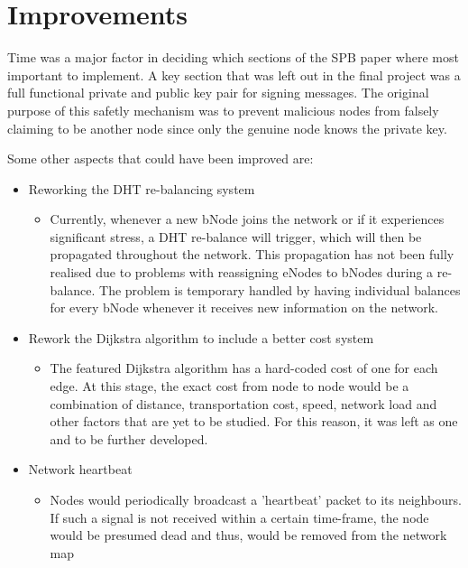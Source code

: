 \chapter{Improvements}\label{ch:improvements}

Time was a major factor in deciding which sections of the SPB paper where most important to implement. A key section that was left out in the final project was a full functional private and public key pair for signing messages. The original purpose of this safetly mechanism was to prevent malicious nodes from falsely claiming to be another node since only the genuine node knows the private key.

Some other aspects that could have been improved are:

\begin{itemize}
  \item Reworking the DHT re-balancing system
  \begin{itemize}
      \item Currently, whenever a new bNode joins the network or if it experiences significant stress, a DHT re-balance will trigger, which will then be propagated throughout the network. This propagation has not been fully realised due to problems with reassigning eNodes to bNodes during a re-balance. The problem is temporary handled by having individual balances for every bNode whenever it receives new information on the network.
  \end{itemize}
  \item Rework the Dijkstra algorithm to include a better cost system
    \begin{itemize}
      \item The featured Dijkstra algorithm has a hard-coded cost of one for each edge. At this stage, the exact cost from node to node would be a combination of distance, transportation cost, speed, network load and other factors that are yet to be studied. For this reason, it was left as one and to be further developed.
    \end{itemize}
  \item Network heartbeat
      \begin{itemize}
      \item Nodes would periodically broadcast a 'heartbeat' packet to its neighbours. If such a signal is not received within a certain time-frame, the node would be presumed dead and thus, would be removed from the network map
      \end{itemize}
\end{itemize}